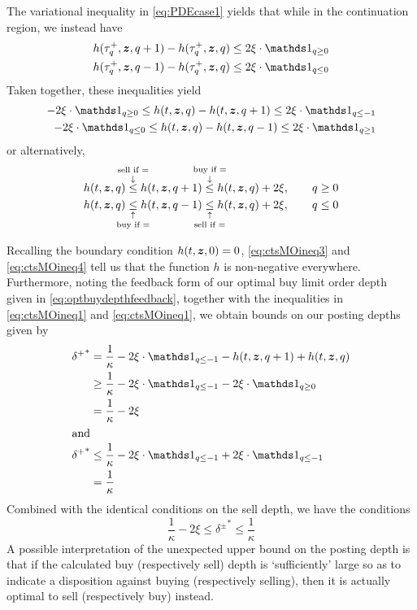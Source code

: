 The variational inequality in \eqref{eq:PDEcase1} yields that while in the continuation region, we instead have
\begin{align}
h(\tau^+_q, \bz, q+1) - h(\tau^+_q,\bz,q) & \leq 2 \xi \cdot \indicator_{q \geq 0} \\
h(\tau^+_q, \bz, q-1) - h(\tau^+_q,\bz,q) & \leq 2 \xi \cdot \indicator_{q \leq 0}
\end{align}
Taken together, these inequalities yield
\begin{align}
-2\xi \cdot \indicator_{q \geq 0} \leq h(t,\bz,q) - h(t,\bz,q+1) \leq 2\xi \cdot \indicator_{q \leq -1} \label{eq:ctsMOineq1}\\
-2\xi \cdot \indicator_{q \leq 0} \leq h(t,\bz,q) - h(t,\bz,q-1) \leq 2\xi \cdot \indicator_{q \geq 1} \label{eq:ctsMOineq2}
\end{align}
or alternatively,
\begin{align}
h(t,\bz,q) \overset{\text{\makebox[0pt]{sell if =}}}{\overset{\downarrow}{\leq}} h(t,\bz,q+1) \overset{\text{\makebox[0pt]{buy if =}}}{\overset{\downarrow}{\leq}} h(t,\bz,q) + 2\xi, \qquad q \geq 0 \label{eq:ctsMOineq3}\\
h(t,\bz,q) \underset{\text{\makebox[0pt]{buy if =}}}{\underset{\uparrow}{\leq}} h(t,\bz,q-1) \underset{\text{\makebox[0pt]{sell if =}}}{\underset{\uparrow}{\leq}} h(t,\bz,q) + 2\xi, \qquad q \leq 0 \label{eq:ctsMOineq4}
\end{align}

Recalling the boundary condition $h(t,\bm{z},0) = 0$, \eqref{eq:ctsMOineq3} and \eqref{eq:ctsMOineq4} tell us that the function $h$ is non-negative everywhere. Furthermore, noting the feedback form of our optimal buy limit order depth given in \eqref{eq:optbuydepthfeedback}, together with the inequalities in \eqref{eq:ctsMOineq1} and \eqref{eq:ctsMOineq1}, we obtain bounds on our posting depths given by
\begin{align}
{\delta^+}^* & = \frac{1}{\kappa} - 2 \xi \cdot \indicator_{q \leq -1} - h(t,\bz,q+1) + h(t,\bz,q) \\
& \geq \frac{1}{\kappa} - 2 \xi \cdot \indicator_{q \leq -1} - 2 \xi \cdot \indicator_{q \geq 0} \\
& = \frac{1}{\kappa} - 2\xi \\
\intertext{and}
{\delta^+}^* & \leq \frac{1}{\kappa} - 2 \xi \cdot \indicator_{q \leq -1} + 2 \xi \cdot \indicator_{q \leq -1} \\
& = \frac{1}{\kappa}
\end{align}
Combined with the identical conditions on the sell depth, we have the conditions
\begin{equation}\label{eq:deltaslowerboundcase1}
\boxed{ \frac{1}{\kappa} - 2\xi  \leq {\delta^\pm}^* \leq \frac{1}{\kappa} }
\end{equation}
A possible interpretation of the unexpected upper bound on the posting depth is that if the calculated buy (respectively sell) depth is `sufficiently' large so as to indicate a disposition against buying (respectively selling), then it is actually optimal to sell (respectively buy) instead.

